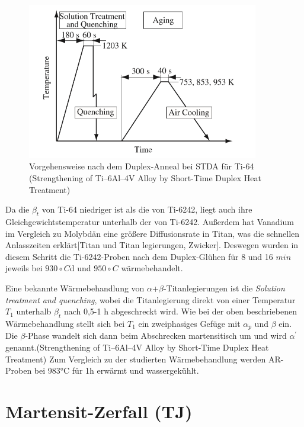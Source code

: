 \begin{figure}[H]
	\centering
	\includegraphics[width=0.9\textwidth]{Bilder/ts-stda}
	\caption{Vorgehensweise nach dem Duplex-Anneal bei STDA für Ti-64 (Strengthening of Ti–6Al–4V Alloy by Short-Time Duplex Heat Treatment)}
	\label{STDA}
\end{figure}

Da die $\beta_{t}$ von Ti-64 niedriger ist als die von Ti-6242, liegt auch ihre Gleichgewichtstemperatur unterhalb der von Ti-6242. Außerdem hat Vanadium im Vergleich zu Molybdän eine größere Diffusionsrate in Titan, was die schnellen Anlasszeiten erklärt[Titan und Titan legierungen, Zwicker]. Deswegen wurden in diesem Schritt die Ti-6242-Proben nach dem Duplex-Glühen für 8 und 16 $min$ jeweils bei $930\circ C$d und $950\circ C$ wärmebehandelt.

Eine bekannte Wärmebehandlung von $\alpha$+$\beta$-Titanlegierungen ist die  \textit{Solution treatment and quenching}, wobei die Titanlegierung direkt von einer Temperatur $T_{1}$ unterhalb  $\beta_{t}$ nach 0,5-1 h abgeschreckt wird. Wie bei der oben beschriebenen Wärmebehandlung stellt sich bei $T_{1}$ ein zweiphasiges Gefüge mit $\alpha_p$ und $\beta$ ein. Die $\beta$-Phase wandelt sich  dann beim Abschrecken martensitisch um und wird $\alpha^\prime$ genannt.(Strengthening of Ti–6Al–4V Alloy by Short-Time Duplex Heat Treatment)
Zum Vergleich zu der studierten Wärmebehandlung werden AR-Proben bei 983°C für 1h erwärmt und wassergekühlt.

\section{Martensit-Zerfall (TJ)}


